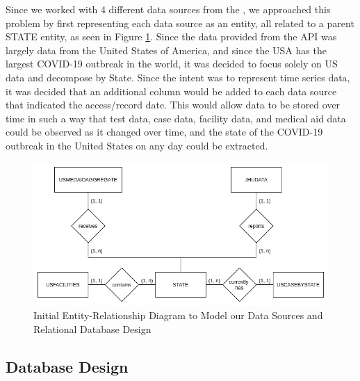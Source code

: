 \documentclass[11pt]{article}
\newcommand{\MYhref}[3][blue]{\href{#2}{\color{#1}{#3}}}%
\begin{document}
\noindent
Since we worked with 4 different data sources from the \MYhref{https://www.npmjs.com/package/covid19-api}{Covid-19 API}, we approached this problem by first representing each data source as an entity, all related to a parent STATE entity, as seen in Figure \ref{fig:er2}. Since the data provided from the API was largely data from the United States of America, and since the USA has the largest COVID-19 outbreak in the world, it was decided to focus solely on US data and decompose by State. Since the intent was to represent time series data, it was decided that an additional column would be added to each data source that indicated the access/record date. This would allow data to be stored over time in such a way that test data, case data, facility data, and medical aid data could be observed as it changed over time, and the state of the COVID-19 outbreak in the United States on any day could be extracted.

\vspace{3em}

\FloatBarrier
\begin{figure}[h]
    \centering
    \includegraphics[width=\textwidth]{diagrams/ER2.png}
    \caption{Initial Entity-Relationship Diagram to Model our Data Sources and Relational Database Design}
    \label{fig:er2}
\end{figure}
\FloatBarrier

\pagebreak

\subsection{Database Design}
\label{subsec:design}
\end{document}
